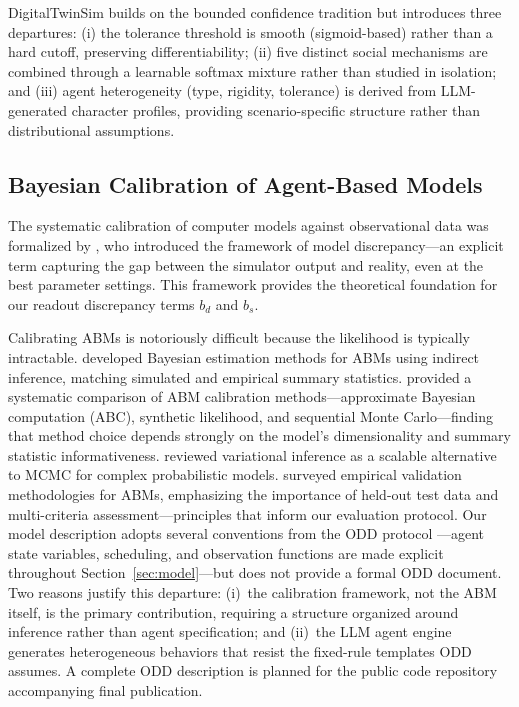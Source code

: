 \documentclass[12pt]{article}
\begin{document}
DigitalTwinSim builds on the bounded confidence tradition but introduces three departures: (i) the tolerance threshold is smooth (sigmoid-based) rather than a hard cutoff, preserving differentiability; (ii) five distinct social mechanisms are combined through a learnable softmax mixture rather than studied in isolation; and (iii) agent heterogeneity (type, rigidity, tolerance) is derived from LLM-generated character profiles, providing scenario-specific structure rather than distributional assumptions.

\subsection{Bayesian Calibration of Agent-Based Models}

The systematic calibration of computer models against observational data was formalized by \citet{kennedy2001}, who introduced the framework of model discrepancy---an explicit term capturing the gap between the simulator output and reality, even at the best parameter settings. This framework provides the theoretical foundation for our readout discrepancy terms $b_d$ and $b_s$.

Calibrating ABMs is notoriously difficult because the likelihood is typically intractable. \citet{grazzini2017} developed Bayesian estimation methods for ABMs using indirect inference, matching simulated and empirical summary statistics. \citet{platt2020} provided a systematic comparison of ABM calibration methods---approximate Bayesian computation (ABC), synthetic likelihood, and sequential Monte Carlo---finding that method choice depends strongly on the model's dimensionality and summary statistic informativeness. \citet{blei2017} reviewed variational inference as a scalable alternative to MCMC for complex probabilistic models. \citet{windrum2007} surveyed empirical validation methodologies for ABMs, emphasizing the importance of held-out test data and multi-criteria assessment---principles that inform our evaluation protocol. Our model description adopts several conventions from the ODD protocol \citep{grimm2006,grimm2010}---agent state variables, scheduling, and observation functions are made explicit throughout Section~\ref{sec:model}---but does not provide a formal ODD document. Two reasons justify this departure: (i)~the calibration framework, not the ABM itself, is the primary contribution, requiring a structure organized around inference rather than agent specification; and (ii)~the LLM agent engine generates heterogeneous behaviors that resist the fixed-rule templates ODD assumes. A complete ODD description is planned for the public code repository accompanying final publication.
\end{document}
